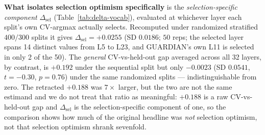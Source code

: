\documentclass[10pt]{article} %
\begin{document}
\textbf{What isolates selection optimism specifically} is the
\emph{selection-specific component} $\Delta_{\text{sel}}$
(Table~\ref{tab:delta-vocab}), evaluated at whichever layer each split's own
CV-argmax actually selects. Recomputed under randomized stratified $400/300$
splits it gives $\Delta_{\text{sel}}=+0.0255$ (SD $0.0186$; $50$ reps; the
selected layer spans 14 distinct values from L5 to L23, and GUARDIAN's own L11
is selected in only 2 of the 50). The \emph{general} CV-vs-held-out gap
averaged across all 32 layers, by contrast, is $+0.192$ under the sequential
split but only $-0.0023$ (SD $0.0541$, $t=-0.30$, $p=0.76$) under the same
randomized splits --- indistinguishable from zero. The retracted $+0.188$ was
$7\times$ larger, but the two are not the same estimand and we do not treat
that ratio as meaningful: $+0.188$ is a raw CV-vs-held-out gap and
$\Delta_{\text{sel}}$ is the selection-specific component of one, so the
comparison shows how much of the original headline was \emph{not} selection
optimism, not that selection optimism shrank sevenfold.
\end{document}
